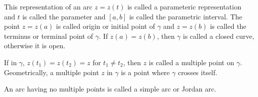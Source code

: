 





	This representation of an arc $z = z(t)$ is called a parameteric representation and $t$ is called the parameter and $[a,b]$ is called the parametric interval. The point $z = z(a)$ is called origin or initial point of $\gamma$ and $z = z(b)$ is called the terminus or terminal point of $\gamma$. If $z(a) = z(b)$, then $\gamma$ is called a closed curve, otherwise it is open.

	If in $\gamma$, $z(t_1) = z(t_2) = z$ for $t_1 \ne t_2$, then $z$ is called a multiple point on $\gamma$. Geometrically, a multiple point $z$ in $\gamma$ is a point where $\gamma$ crosses itself.

	An arc having no multiple points is called a simple arc or Jordan arc.


